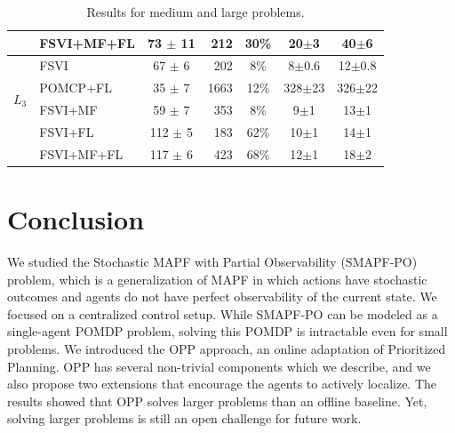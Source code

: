\documentclass[letterpaper]{article} %
\newcommand{\itay}[1]{}
\begin{document}
\begin{table}
{\begin{tabular}{ |c|l|c|r|c|c|c| }
    & FSVI+MF+FL\itay{+} & 73 $\pm$ 11 & 212 & 30\% & 20$\pm$3 & 40$\pm$6 \\
    \hline \hline
    \multirow{4}{*}{$L_3$}
    & FSVI\itay{+} & 67 $\pm$ 6 & 202 & 8\% & 8$\pm$0.6 & 12$\pm$0.8 \\
    & POMCP+FL\itay{+} & 35 $\pm$ 7 & 1663 & 12\% & 328$\pm$23 & 326$\pm$22 \\
    & FSVI+MF\itay{+} & 59 $\pm$ 7 & 353 & 8\% & 9$\pm$1 & 13$\pm$1 \\
    &FSVI+FL\itay{+} & 112 $\pm$ 5 & 183 & 62\% & 10$\pm$1 & 14$\pm$1 \\
    & FSVI+MF+FL\itay{+} & 117 $\pm$ 6 & 423 & 68\% & 12$\pm$1 & 18$\pm$2 \\ 
    \hline
    \end{tabular}
    }
    \caption{Results for medium and large problems.}%
    \vspace{-0.3cm}
    \label{tab:large-results}
\end{table}





 
\section{Conclusion}

We studied the Stochastic MAPF with Partial Observability (SMAPF-PO) problem, which is a generalization of MAPF in which actions have stochastic outcomes and agents do not have perfect observability of the current state. We focused on a centralized control setup. While SMAPF-PO can be modeled as a single-agent POMDP problem, solving this POMDP is intractable even for small problems.
We introduced the OPP approach, an online adaptation of Prioritized Planning. OPP has several non-trivial components which we describe, and we also propose two extensions that encourage the agents to actively localize. The results showed that OPP solves larger problems than an offline baseline. 
Yet, solving larger problems is still an open challenge for future work. 







\end{document}
